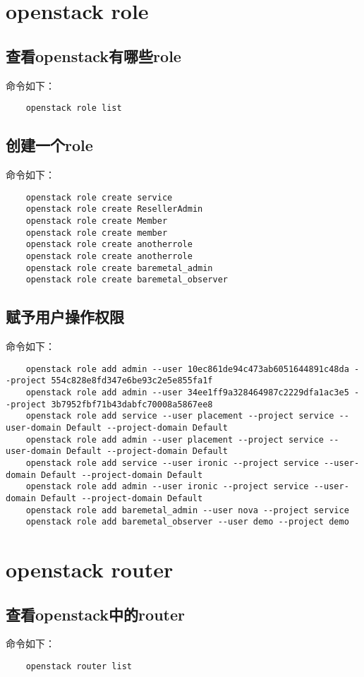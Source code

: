 \documentclass[a4paper,left=1.5cm,right=1.5cm,11pt]{article}
\begin{document}
\section{openstack role}
\subsection{查看openstack有哪些role}
	命令如下：
	\begin{lstlisting}
	openstack role list
	\end{lstlisting}

\subsection{创建一个role}
	命令如下：
	\begin{lstlisting}
	openstack role create service
	openstack role create ResellerAdmin
	openstack role create Member
	openstack role create member
	openstack role create anotherrole
	openstack role create anotherrole
	openstack role create baremetal_admin
	openstack role create baremetal_observer
	\end{lstlisting}

\subsection{赋予用户操作权限}
	命令如下：
	\begin{lstlisting}
	openstack role add admin --user 10ec861de94c473ab6051644891c48da --project 554c828e8fd347e6be93c2e5e855fa1f
	openstack role add admin --user 34ee1ff9a328464987c2229dfa1ac3e5 --project 3b7952fbf71b43dabfc70008a5867ee8
	openstack role add service --user placement --project service --user-domain Default --project-domain Default
	openstack role add admin --user placement --project service --user-domain Default --project-domain Default
	openstack role add service --user ironic --project service --user-domain Default --project-domain Default
	openstack role add admin --user ironic --project service --user-domain Default --project-domain Default
	openstack role add baremetal_admin --user nova --project service
	openstack role add baremetal_observer --user demo --project demo
	\end{lstlisting}

\section{openstack router}
\subsection{查看openstack中的router}
	命令如下：
	\begin{lstlisting}
	openstack router list
	\end{lstlisting}
\end{document}
